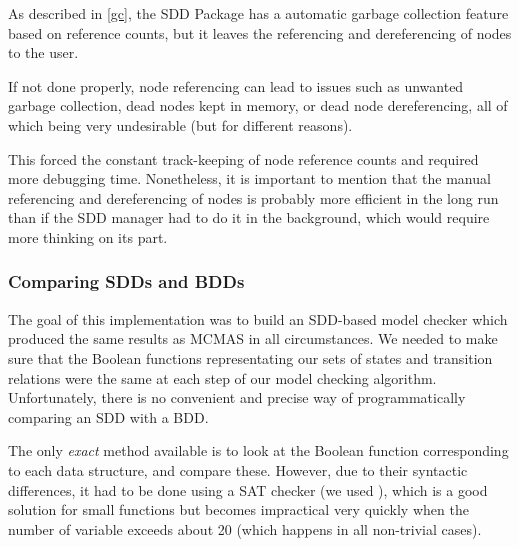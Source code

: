 \documentclass[11pt]{article}
\begin{document}
As described in \ref{gc}, the SDD Package has a automatic garbage collection feature based on reference counts, but it leaves the referencing and dereferencing of nodes to the user. 

If not done properly, node referencing can lead to issues such as unwanted garbage collection, dead nodes kept in memory, or dead node dereferencing, all of which being very undesirable (but for different reasons).

This forced the constant track-keeping of node reference counts and required more debugging time. Nonetheless, it is important to mention that the manual referencing and dereferencing of nodes is probably more efficient in the long run than if the SDD manager had to do it in the background, which would require more thinking on its part.

\subsubsection{Comparing SDDs and BDDs}

The goal of this implementation was to build an SDD-based model checker which produced the same results as MCMAS in all circumstances. We needed to make sure that the Boolean functions representating our sets of states and transition relations were the same at each step of our model checking algorithm. Unfortunately, there is no convenient and precise way of programmatically comparing an SDD with a BDD. 

The only \textit{exact} method available is to look at the Boolean function corresponding to each data structure, and compare these. However, due to their syntactic differences, it had to be done using a SAT checker (we used \cite{minisat}), which is a good solution for small functions but becomes impractical very quickly when the number of variable exceeds about 20 (which happens in all non-trivial cases).  
\end{document}
